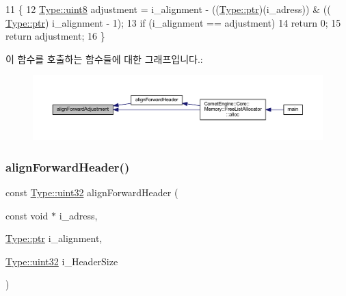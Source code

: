 \begin{DoxyCode}
11 \{
12     \hyperlink{namespace_comet_engine_1_1_type_a1b09856a6463f2bcc4bd8ff0e4e3ee0f}{Type::uint8} adjustment = i\_alignment - ((\hyperlink{namespace_comet_engine_1_1_type_aeb22ad46de677e9a50679dfebeb0e6f0}{Type::ptr})(i\_adress)) & ((
      \hyperlink{namespace_comet_engine_1_1_type_aeb22ad46de677e9a50679dfebeb0e6f0}{Type::ptr}) i\_alignment - 1);
13     \textcolor{keywordflow}{if} (i\_alignment == adjustment)
14         \textcolor{keywordflow}{return} 0;
15     \textcolor{keywordflow}{return} adjustment;
16 \}
\end{DoxyCode}
이 함수를 호출하는 함수들에 대한 그래프입니다.\+:\nopagebreak
\begin{figure}[H]
\begin{center}
\leavevmode
\includegraphics[width=350pt]{namespace_comet_engine_1_1_core_1_1_memory_1_1_utils_aa5a0140d498d631a747be87791063f2d_icgraph}
\end{center}
\end{figure}
\mbox{\label{namespace_comet_engine_1_1_core_1_1_memory_1_1_utils_a57bbceefc56fa0e2ec1e472d85ce5e19}} 
\subsubsection{\texorpdfstring{align\+Forward\+Header()}{alignForwardHeader()}}
{\footnotesize\ttfamily const \hyperlink{namespace_comet_engine_1_1_type_ada4c95a4173a4bb540c8a7f80f3665d2}{Type\+::uint32} align\+Forward\+Header (\begin{DoxyParamCaption}\item[{const void $\ast$}]{i\+\_\+adress,  }\item[{\hyperlink{namespace_comet_engine_1_1_type_aeb22ad46de677e9a50679dfebeb0e6f0}{Type\+::ptr}}]{i\+\_\+alignment,  }\item[{\hyperlink{namespace_comet_engine_1_1_type_ada4c95a4173a4bb540c8a7f80f3665d2}{Type\+::uint32}}]{i\+\_\+\+Header\+Size }\end{DoxyParamCaption})}



